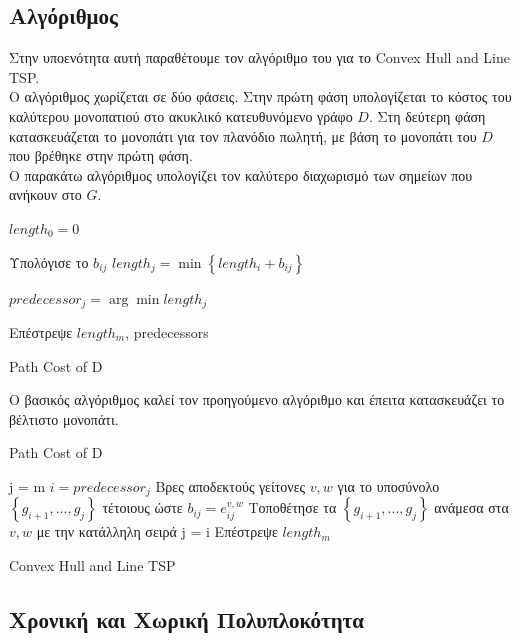 \documentclass[oneside,12pt]{book}
\theoremstyle{definition}
\begin{document}
\subsection{Αλγόριθμος}

Στην υποενότητα αυτή παραθέτουμε τον αλγόριθμο του \cite{17} για το Convex Hull and Line TSP.  \\

Ο αλγόριθμος χωρίζεται σε δύο φάσεις. Στην πρώτη φάση υπολογίζεται το κόστος του καλύτερου μονοπατιού στο ακυκλικό κατευθυνόμενο γράφο \(D\). Στη δεύτερη φάση κατασκευάζεται το μονοπάτι για τον πλανόδιο πωλητή, με βάση το μονοπάτι του \(D\) που βρέθηκε στην πρώτη φάση. \\

Ο παρακάτω αλγόριθμος υπολογίζει τον καλύτερο διαχωρισμό των σημείων που ανήκουν στο \(G\). \\

\begin{algorithm}[H]
	\SetAlgoLined
	
	\(length_0 = 0\) \;
	{
		{
			Υπολόγισε το \(b_{ij}\) \;
			\(length_j = \min \left\{ length_i + b_{ij} \right\}\) \;
		}
	
		\(predecessor_j = \arg \min length_j\)
	}
	Επέστρεψε \(length_m \), predecessors
	
	\caption{Path Cost of D}
\end{algorithm}

Ο βασικός αλγόριθμος καλεί τον προηγούμενο αλγόριθμο και έπειτα κατασκευάζει το βέλτιστο μονοπάτι. \\

\begin{algorithm}[H]
	\SetAlgoLined

	
	Path Cost of D \;
	
	j = m \;
	{
		\(i = predecessor_j\) \;
		Βρες αποδεκτούς γείτονες \(v,w\) για το υποσύνολο \(\left\{ g_{i+1},...,g_j \right\}\) τέτοιους ώστε \(b_{ij} = e^{v,w}_{ij}\) \;
		Τοποθέτησε τα \(\left\{ g_{i+1},...,g_j \right\}\) ανάμεσα στα \(v,w\) με την κατάλληλη σειρά \;
		j = i \;
	}
	Επέστρεψε \(length_m \)
	
	\caption{Convex Hull and Line TSP}
\end{algorithm}

\subsection{Χρονική και Χωρική Πολυπλοκότητα}
\end{document}
